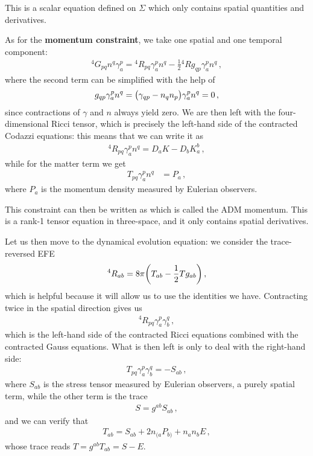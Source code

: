 \documentclass[main.tex]{subfiles}
\begin{document}
This is a scalar equation defined on \(\Sigma \) which only contains spatial quantities and derivatives. 

As for the \textbf{momentum constraint}, we take one spatial and one temporal component: 
%
\begin{align}
{}^4 G_{pq} n^q \gamma_{a}^{p} = {}^4 R_{pq} \gamma^{p}_{a} n^q - \frac{1}{2} {}^4 R g_{qp} \gamma^{p}_a n^q 
\,,
\end{align}
%
where the second term can be simplified with the help of
%
\begin{align}
g_{qp} \gamma^{p}_a n^q = \qty(\gamma_{qp} - n_q n_p) \gamma^{p}_a n^q =0 
\,,
\end{align}
%
since contractions of \(\gamma \) and \(n\) always yield zero. 
We are then left with the four-dimensional Ricci tensor, which is precisely the left-hand side of the contracted Codazzi equations: this means that we can write it as 
%
\begin{align}
{}^4 R_{pq} \gamma^{p}_{a} n^q
= D_a K - D_b K^{b}_a
\,,
\end{align}
%
while for the matter term we get 
%
\begin{align}
T_{pq} \gamma^{p}_a n^q &= P_a 
\,,
\end{align}
%
where \(P_a\) is the momentum density measured by Eulerian observers. 

This constraint can then be written as 
%
%
which is called the ADM momentum. 
This is a rank-1 tensor equation in three-space, and it only contains spatial derivatives. 

Let us then move to the dynamical evolution equation: we consider the trace-reversed EFE 
%
\begin{align}
{}^{4} R_{ab} = 8 \pi \qty(T_{ab} - \frac{1}{2} T g_{ab})
\,,
\end{align}
%
which is helpful because it will allow us to use the identities we have. 
Contracting twice in the spatial direction gives us 
%
\begin{align}
{}^{4} R_{pq} \gamma^{p}_a \gamma^{q}_b 
\,,
\end{align}
%
which is the left-hand side of the contracted Ricci equations combined with the contracted Gauss equations.
What is then left is only to deal with the right-hand side: 
%
\begin{align}
T_{pq} \gamma^{p}_{a} \gamma^{q}_b = - S_{ab}
\,,
\end{align}
%
where \(S_{ab}\) is the stress tensor measured by Eulerian observers, a purely spatial term, while the other term is the trace
%
\begin{align}
S = g^{ab} S_{ab}
\,,
\end{align}
%
and we can verify that 
%
\begin{align}
T_{ab} = S_{ab} + 2 n_{(a} P_{b)} + n_a n_b E
\,,
\end{align}
%
whose trace reads \(T = g^{ab} T_{ab} = S - E\).
\end{document}
